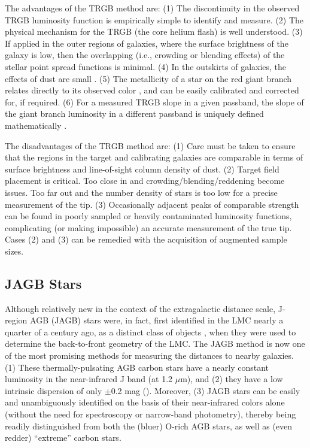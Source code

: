 \documentclass[12pt,modern]{aastex631}
\begin{document}
The advantages of the TRGB method are: (1) The discontinuity in the observed TRGB luminosity function is empirically simple to identify and measure. (2) The physical mechanism for the TRGB (the core helium flash) is well understood. (3) If applied in the outer regions of galaxies, where the surface brightness of the galaxy is low, then the overlapping (i.e., crowding or blending effects) of the stellar point spread functions is minimal. (4) In the outskirts of galaxies, the effects of dust are small \citep[e.g.,][]{menard_2010}. 
(5) The metallicity of a star on the red giant branch relates directly to its observed color  \citep[e.g.,][]{da_costa_armandroff_1990, carretta_bragaglia_1998}, and can be easily calibrated and corrected for, if required. (6) For a measured TRGB slope in a given passband, the slope of the giant branch luminosity in a different passband is uniquely defined mathematically   \citep{madore_freedman_2020}.



The disadvantages of the TRGB method are: (1) Care must be taken to ensure that the regions in the target and calibrating galaxies are comparable in terms of surface brightness and line-of-sight column density of dust. (2) Target field placement is critical. Too close in and crowding/blending/reddening become issues. Too far out and the number density of stars is too low for a precise measurement of the tip. (3) Occasionally adjacent peaks of comparable strength can be found in poorly sampled or heavily contaminated luminosity functions, complicating (or making impossible) an accurate measurement of the true tip. Cases (2) and (3) can be remedied with the acquisition of augmented sample sizes.

\medskip\medskip\medskip\medskip\medskip

\subsection{JAGB Stars}
\label{sec:jagb}

Although relatively new in the context of the  extragalactic distance scale, J-region AGB (JAGB) stars were, in fact, first identified in the LMC nearly a quarter of a century ago, as a distinct class of objects \citep{nikolaev_weinberg_2000, weinberg_nikolaev_2001},  when they were used to determine the back-to-front geometry of the LMC. The JAGB method is now one of the most promising methods for measuring the distances to nearby galaxies. (1) These thermally-pulsating AGB carbon stars have a nearly constant luminosity in the near-infrared J band (at 1.2 $\mu$m), and (2) they have a low intrinsic dispersion  of only $\pm$0.2 mag (\cite{nikolaev_weinberg_2000, madore_freedman_2020}). Moreover, (3) JAGB stars can be easily and unambiguously identified on the basis of their near-infrared colors alone (without the need for spectroscopy or narrow-band photometry), thereby being readily distinguished from both the (bluer) O-rich AGB stars, as well as (even redder) ``extreme'' carbon stars. 
\end{document}
